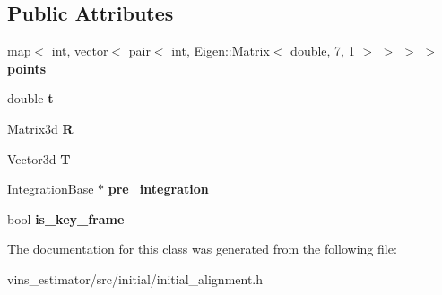 \subsection*{Public Attributes}
\begin{DoxyCompactItemize}
\item 
\mbox{\label{classImageFrame_a7c19d1ea0b385900eaead6fca21164f3}} 
map$<$ int, vector$<$ pair$<$ int, Eigen\+::\+Matrix$<$ double, 7, 1 $>$ $>$ $>$ $>$ {\bfseries points}
\item 
\mbox{\label{classImageFrame_a3fc06b144d1ec5228e10ed3d00c4d3a8}} 
double {\bfseries t}
\item 
\mbox{\label{classImageFrame_acb0a780187c7be6929e04bfd8a55101f}} 
Matrix3d {\bfseries R}
\item 
\mbox{\label{classImageFrame_ae7125fb16ded49353b68cc08055a602c}} 
Vector3d {\bfseries T}
\item 
\mbox{\label{classImageFrame_a71bb939113249495cecc2b531cbcdb2a}} 
\hyperlink{classIntegrationBase}{Integration\+Base} $\ast$ {\bfseries pre\+\_\+integration}
\item 
\mbox{\label{classImageFrame_adb79e5b92ad6d57b8fb302fc51188e73}} 
bool {\bfseries is\+\_\+key\+\_\+frame}
\end{DoxyCompactItemize}


The documentation for this class was generated from the following file\+:\begin{DoxyCompactItemize}
\item 
vins\+\_\+estimator/src/initial/initial\+\_\+alignment.\+h\end{DoxyCompactItemize}
